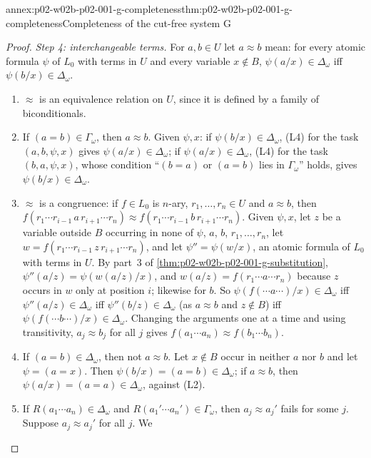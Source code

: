 \begin{annexitem}{annex:p02-w02b-p02-001-g-completeness}{thm:p02-w02b-p02-001-g-completeness}{Completeness of the cut-free system G}
\begin{proof}
\emph{Step 4: interchangeable terms.}  For \(a,b\in U\) let
\(a\approx b\) mean: for every atomic formula \(\psi\) of \(L_0\) with terms
in \(U\) and every variable \(x\notin B\),
\(\psi(a/x)\in\Delta_\omega\) iff \(\psi(b/x)\in\Delta_\omega\).
\begin{enumerate}
\item[(i)] \(\approx\) is an equivalence relation on \(U\), since it is
      defined by a family of biconditionals.
\item[(ii)] If \((a=b)\in\Gamma_\omega\), then \(a\approx b\).  Given
      \(\psi,x\): if \(\psi(b/x)\in\Delta_\omega\), (L4) for the task
      \((a,b,\psi,x)\) gives \(\psi(a/x)\in\Delta_\omega\); if
      \(\psi(a/x)\in\Delta_\omega\), (L4) for the task \((b,a,\psi,x)\),
      whose condition ``\((b=a)\) or \((a=b)\) lies in \(\Gamma_\omega\)''
      holds, gives \(\psi(b/x)\in\Delta_\omega\).
\item[(iii)] \(\approx\) is a congruence: if \(f\in L_0\) is \(n\)-ary,
      \(r_1,\ldots,r_n\in U\) and \(a\approx b\), then
      \(f(r_1\cdots r_{i-1}\,a\,r_{i+1}\cdots r_n)\approx
      f(r_1\cdots r_{i-1}\,b\,r_{i+1}\cdots r_n)\).  Given \(\psi,x\), let
      \(z\) be a variable outside \(B\) occurring in none of \(\psi\),
      \(a\), \(b\), \(r_1,\ldots,r_n\), let
      \(w=f(r_1\cdots r_{i-1}\,z\,r_{i+1}\cdots r_n)\), and let
      \(\psi''=\psi(w/x)\), an atomic formula of \(L_0\) with terms in
      \(U\).  By part~3 of \cref{thm:p02-w02b-p02-001-g-substitution},
      \(\psi''(a/z)=\psi(w(a/z)/x)\), and
      \(w(a/z)=f(r_1\cdots a\cdots r_n)\) because \(z\) occurs in \(w\) only
      at position \(i\); likewise for \(b\).  So
      \(\psi(f(\cdots a\cdots)/x)\in\Delta_\omega\) iff
      \(\psi''(a/z)\in\Delta_\omega\) iff \(\psi''(b/z)\in\Delta_\omega\)
      (as \(a\approx b\) and \(z\notin B\)) iff
      \(\psi(f(\cdots b\cdots)/x)\in\Delta_\omega\).  Changing the
      arguments one at a time and using transitivity, \(a_j\approx b_j\)
      for all \(j\) gives
      \(f(a_1\cdots a_n)\approx f(b_1\cdots b_n)\).
\item[(iv)] If \((a=b)\in\Delta_\omega\), then not \(a\approx b\).  Let
      \(x\notin B\) occur in neither \(a\) nor \(b\) and let
      \(\psi=(a=x)\).  Then \(\psi(b/x)=(a=b)\in\Delta_\omega\); if
      \(a\approx b\), then \(\psi(a/x)=(a=a)\in\Delta_\omega\), against
      (L2).
\item[(v)] If \(R(a_1\cdots a_n)\in\Delta_\omega\) and
      \(R(a_1'\cdots a_n')\in\Gamma_\omega\), then \(a_j\approx a_j'\)
      fails for some \(j\).  Suppose \(a_j\approx a_j'\) for all \(j\).  We

\end{enumerate}
\end{proof}
\end{annexitem}
